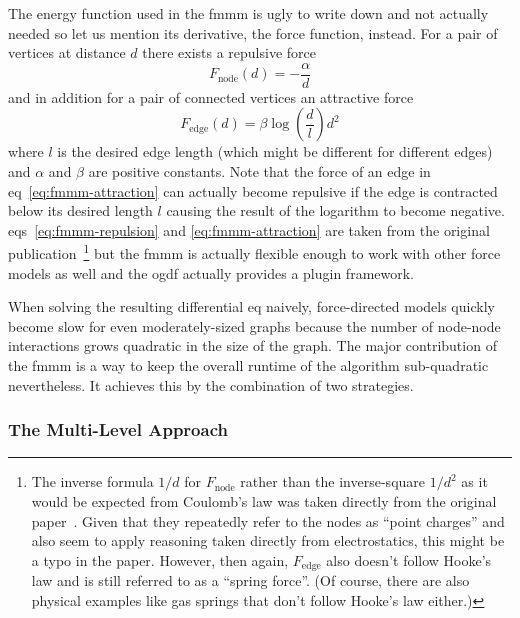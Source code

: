 \documentclass{graphstudy}
\begin{document}
The energy function used in the \ac{fmmm} is ugly to write down and not actually needed so let us mention its
derivative, the force function, instead.  For a pair of vertices at distance \(d\) there exists a repulsive force
\begin{equation}
  \label{eq:fmmm-repulsion}
  F_\mathrm{node}(d) = -\frac{\alpha}{d}
\end{equation}
and in addition for a pair of connected vertices an attractive force
\begin{equation}
  \label{eq:fmmm-attraction}
  F_\mathrm{edge}(d) = \beta \log\left(\frac{d}{l}\right) d^2
\end{equation}
where \(l\) is the desired edge length (which might be different for different edges) and \(\alpha\) and \(\beta\) are
positive constants.  Note that the force of an edge in \acl{eq}~\ref{eq:fmmm-attraction} can actually become repulsive
if the edge is contracted below its desired length \(l\) causing the result of the logarithm to become negative.
\Aclp*{eq}~\ref{eq:fmmm-repulsion} and \ref{eq:fmmm-attraction} are taken from the original
publication~\cite[\acs{section}~2.1]{Hachul2005}\footnote{%
  The inverse formula \(1/d\) for \(F_\mathrm{node}\) rather than the inverse-square \(1/d^2\) as it would be expected
  from Coulomb's law was taken directly from the original paper~\cite{Hachul2005}.  Given that they repeatedly refer to
  the nodes as \enquote{point charges} and also seem to apply reasoning taken directly from electrostatics, this might
  be a typo in the paper.  However, then again, \(F_\mathrm{edge}\) also doesn't follow Hooke's law and is still
  referred to as a \enquote{spring force}.  (Of course, there are also physical examples like gas springs that don't
  follow Hooke's law either.)
}
but the \ac{fmmm} is actually flexible enough to work with other force models as well and the \ac{ogdf} actually
provides a plugin framework.

When solving the resulting differential \acl{eq} naively, force-directed models quickly become slow for even
moderately-sized graphs because the number of node-node interactions grows quadratic in the size of the graph.  The
major contribution of the \ac{fmmm} is a way to keep the overall runtime of the algorithm sub-quadratic nevertheless.
It achieves this by the combination of two strategies.

\subsubsection{The Multi-Level Approach}
\end{document}
